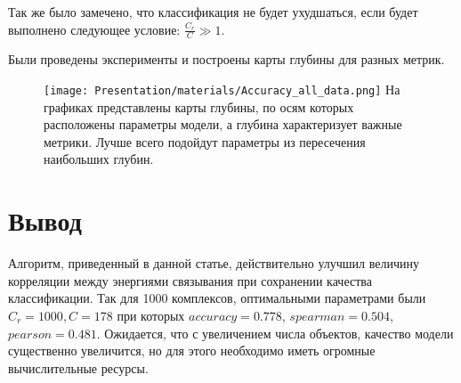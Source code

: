 \documentclass[CEJM,PDF]{Class+Reg_in_Molec_Docking} %
\begin{document}
Так же было замечено, что классификация не будет ухудшаться, если будет выполнено следующее условие: $\frac{C_r}{C}\gg1$.

Были проведены эксперименты и построены карты глубины для разных метрик.

\begin{figure}[h]
\begin{minipage}[h]{0.49\linewidth}
\end{minipage}
\hfill
\begin{minipage}[h]{0.49\linewidth}
\texttt{[image: Presentation/materials/Accuracy\_all\_data.png]}
На графиках представлены карты глубины, по осям которых расположены параметры модели, а глубина характеризует важные метрики. Лучше всего подойдут параметры из пересечения наибольших глубин.
$\;\;\;\;\;\;\;\;\;\;\;\;\;\;\;\;\;\;\;\;\;\;\;\;\;\;\;\;\;\;\;\;\;\;\;\;\;\;\;\;\;\;\;\;\;\;\;\;\;\;\;\;\;\;\;\;\;\;\;\;\;\;\;\;\;\;\;\;\;\;\;\;\;\;\;\;\;\;\;\;\;\;\;\;\;\;\;\;\;\;\;\;\;\;$
\end{minipage}
\end{figure}

\section{Вывод}

Алгоритм, приведенный в данной статье, действительно улучшил величину корреляции между энергиями связывания при сохранении качества классификации. Так для 1000 комплексов, оптимальными параметрами были $C_r = 1000, C = 178$ при которых $accuracy = 0.778$, $spearman = 0.504$, $pearson = 0.481$. Ожидается, что с увеличением числа объектов, качество модели существенно увеличится, но для этого необходимо иметь огромные вычислительные ресурсы.


\end{document}
